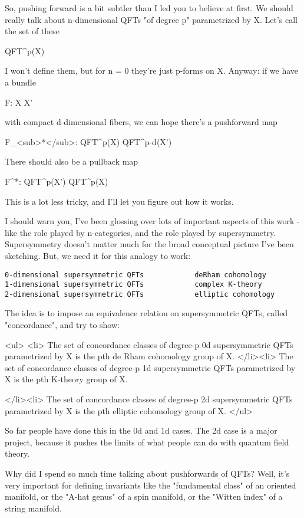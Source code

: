So, pushing forward is a bit subtler than I led you to believe at
first.  We should really talk about n-dimensional QFTs "of degree
p" parametrized by X.  Let's call the set of these

QFT^{p}(X)

I won't define them, but for n = 0 they're just p-forms on X.   
Anyway: if we have a bundle

F: X \to  X'

with compact d-dimensional fibers, we can hope there's a
pushforward map

F_{<sub>*}</sub>: QFT^{p}(X) \to  QFT^{p-d}(X')

There should also be a pullback map

F^{*}: QFT^{p}(X') \to  QFT^{p}(X)

This is a lot less tricky, and I'll let you figure out how
it works.

I should warn you, I've been glossing over lots of important
aspects of this work - like the role played by n-categories,
and the role played by supersymmetry.  Supersymmetry doesn't 
matter much for the broad conceptual picture I've been sketching.  
But, we need it for this analogy to work:

\begin{verbatim}
0-dimensional supersymmetric QFTs            deRham cohomology
1-dimensional supersymmetric QFTs            complex K-theory
2-dimensional supersymmetric QFTs            elliptic cohomology
\end{verbatim}
    
The idea is to impose an equivalence relation on supersymmetric 
QFTs, called "concordance", and try to show:

<ul>
<li>
 The set of concordance classes of degree-p 0d supersymmetric 
 QFTs parametrized by X is the pth de Rham cohomology group of X.
</li><li>
 The set of concordance classes of degree-p 1d supersymmetric 
 QFTs parametrized by X is the pth K-theory group of X.
 
</li><li>
 The set of concordance classes of degree-p 2d supersymmetric 
 QFTs parametrized by X is the pth elliptic cohomology group of X.
</ul>

So far people have done this in the 0d and 1d cases.  The 2d 
case is a major project, because it pushes the limits of what 
people can do with quantum field theory. 

Why did I spend so much time talking about pushforwards of
QFTs?   Well, it's very important for defining invariants like 
the "fundamental class" of an oriented manifold, or the "A-hat 
genus" of a spin manifold, or the "Witten index" of a string 
manifold.

